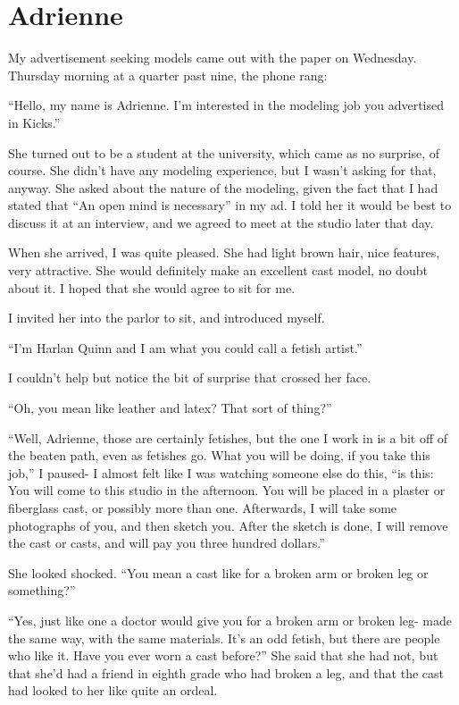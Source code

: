 \chapter{Adrienne}
My advertisement seeking models came out with the paper on Wednesday. Thursday morning at a
quarter past nine, the phone rang:

``Hello, my name is Adrienne. I'm interested in the modeling job you advertised in Kicks.''

She turned out to be a student at the university, which came as no surprise, of course. She
didn't have any modeling experience, but I wasn't asking for that, anyway. She asked about the
nature of the modeling, given the fact that I had stated that ``An open mind is necessary'' in
my ad. I told her it would be best to discuss it at an interview, and we agreed to meet at the
studio later that day.

When she arrived, I was quite pleased. She had light brown hair, nice features, very
attractive. She would definitely make an excellent cast model, no doubt about it. I hoped that
she would agree to sit for me.

I invited her into the parlor to sit, and introduced myself.

``I'm Harlan Quinn and I am what you could call a fetish artist.''

I couldn't help but notice the bit of surprise that crossed her face.

``Oh, you mean like leather and latex? That sort of thing?''

``Well, Adrienne, those are certainly fetishes, but the one I work in is a bit off of the
beaten path, even as fetishes go. What you will be doing, if you take this job,'' I paused- I
almost felt like I was watching someone else do this, ``is this: You will come to this studio in
the afternoon. You will be placed in a plaster or fiberglass cast, or possibly more than one.
Afterwards, I will take some photographs of you, and then sketch you. After the sketch is done,
I will remove the cast or casts, and will pay you three hundred dollars.''

She looked shocked. ``You mean a cast like for a broken arm or broken leg or something?''

``Yes, just like one a doctor would give you for a broken arm or broken leg- made the same
way, with the same materials. It's an odd fetish, but there are people who like it. Have you
ever worn a cast before?'' She said that she had not, but that she'd had a friend in eighth
grade who had broken a leg, and that the cast had looked to her like quite an ordeal.

